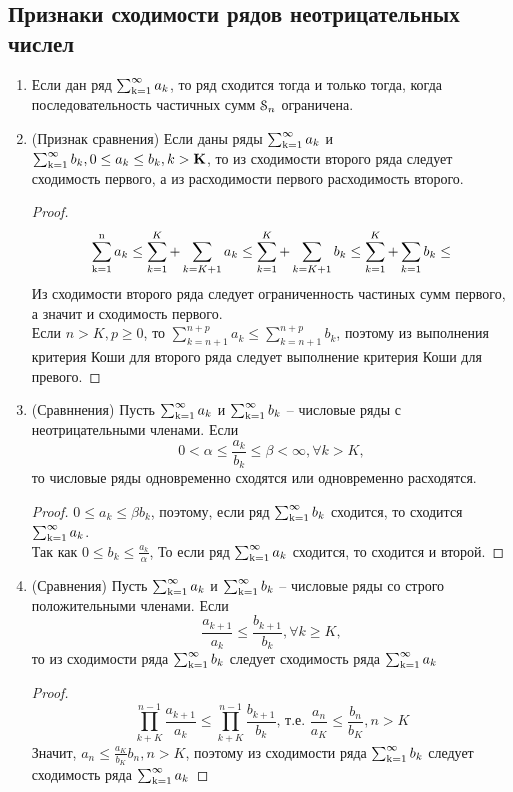 \chapter{}
\section*{Признаки сходимости рядов неотрицательных числел}
\begin{enumerate}
\item
Если дан ряд $\operatorname{\sum_{k=1}^{\infty}} a_k$, то ряд сходится тогда и только тогда, когда последовательность частичных сумм $\operatorname{\EuScript{S}}_n$ ограничена.
\item
(Признак сравнения) Если даны  ряды $\operatorname{\sum_{k=1}^{\infty}} a_k $ и $\operatorname{\sum_{k=1}^{\infty}} b_k , 0 \le a_k \le b_k, k>\mathbf K$, то из сходимости второго ряда следует сходимость первого, а из расходимости первого расходимость второго.
\begin{proof}
$$ \operatorname{\sum_{k=1}^{n}} a_k \le \sum_{k=1}^{K} + \sum_{k=K+1} a_k \le \sum_{k=1}^{K} + \sum_{k=K+1} b_k \le  \sum_{k=1}^{K} + \sum_{k=1} b_k \le$$
Из сходимости второго ряда следует ограниченность частиных сумм первого, а значит и сходимость первого.\\
Если $n>K, p \ge 0$, то $\sum_{k=n+1}^{n+p}a_k \le \sum_{k=n+1}^{n+p} b_k$, поэтому из выполнения критерия Коши для второго ряда следует выполнение критерия Коши для превого. 
\end{proof}
\item
(Сравннения) Пусть $\operatorname{\sum_{k=1}^{\infty}} a_k $ и $\operatorname{\sum_{k=1}^{\infty}} b_k$ -- числовые ряды с неотрицательными членами. Если $$0 < \alpha \le \frac{a_k}{b_k} \le \beta < \infty, \forall k>K,$$
то числовые ряды одновременно сходятся или одновременно расходятся.
\begin{proof}
$0 \le a_k \le \beta b_k$, поэтому, если ряд $\operatorname{\sum_{k=1}^{\infty}} b_k$ сходится, то сходится $\operatorname{\sum_{k=1}^{\infty}} a_k$.\\
Так как $0 \le b_k \le \frac{a_k}{\alpha}$,
То если ряд $\operatorname{\sum_{k=1}^{\infty}} a_k$ сходится, то сходится и второй.
\end{proof}
\item
(Сравнения) Пусть $\operatorname{\sum_{k=1}^{\infty}} a_k $ и $\operatorname{\sum_{k=1}^{\infty}} b_k$ -- числовые ряды со строго положительными членами. Если
$$ \frac{a_{k+1}}{a_k}\le \frac{b_{k+1}}{b_k}, \forall k \ge K,$$
то из сходимости ряда $\operatorname{\sum_{k=1}^{\infty}} b_k$ следует сходимость ряда $\operatorname{\sum_{k=1}^{\infty}} a_k$
\begin{proof}
$$ \prod_{k+K}^{n-1}\frac{a_{k+1}}{a_k} \le \prod_{k+K}^{n-1}\frac{b_{k+1}}{b_k}\text{, т.е. } \frac{a_{n}}{a_K} \le \frac{b_{n}}{b_K}, n>K$$
Значит, $a_n \le \frac{a_K}{b_K}b_n, n>K$, поэтому из сходимости ряда $\operatorname{\sum_{k=1}^{\infty}} b_k$ следует сходимость ряда $\operatorname{\sum_{k=1}^{\infty}} a_k$

\end{proof}
\end{enumerate}
